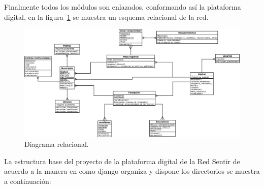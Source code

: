 \documentclass[journal,transmag]{IEEEtran}
\begin{document}
Finalmente todos los módulos son enlazados, conformando así la plataforma digital, en la figura~\ref{fig:red} se muestra un esquema relacional de la red.

\begin{figure}[t]
\centering
\includegraphics[width=1\linewidth]{red.eps}
\caption{Diagrama relacional.}
\label{fig:red}
\end{figure}

La estructura base del proyecto de la plataforma digital de la Red Sentir de acuerdo a la manera en como django organiza y dispone los directorios se muestra a continuación:

\vspace{4mm}
\end{document}
